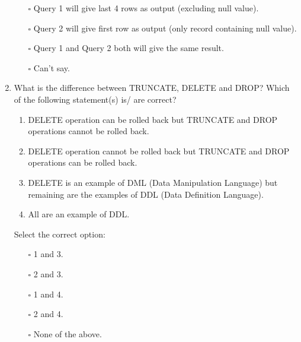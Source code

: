\documentclass[10pt]{article}
\begin{document}
\begin{enumerate}
				\begin{enumerate}
					\item[$\square$] Query 1 will give last 4 rows as output (excluding null value).
					\item[$\square$] Query 2 will give first row as output (only record containing null value).
					\item[$\square$] Query 1 and Query 2 both will give the same result.
					\item[$\square$] Can’t say.
				\end{enumerate}

			\item What is the difference between TRUNCATE, DELETE and DROP? Which of the following statement(s) is/ are correct?
				\begin{enumerate}
					\item DELETE operation can be rolled back but TRUNCATE and DROP operations cannot be rolled back.
					\item DELETE operation cannot be rolled back but TRUNCATE and DROP operations can be rolled back.
					\item DELETE is an example of DML (Data Manipulation Language) but remaining are the examples of DDL (Data Definition Language).
					\item All are an example of DDL.
				\end{enumerate}
				Select the correct option:
				\begin{enumerate}
					\item[$\square$] 1 and 3.
					\item[$\square$] 2 and 3.
					\item[$\square$] 1 and 4.
					\item[$\square$] 2 and 4.
					\item[$\square$] None of the above.
				\end{enumerate}
			
			\newpage


\end{enumerate}
\end{document}
